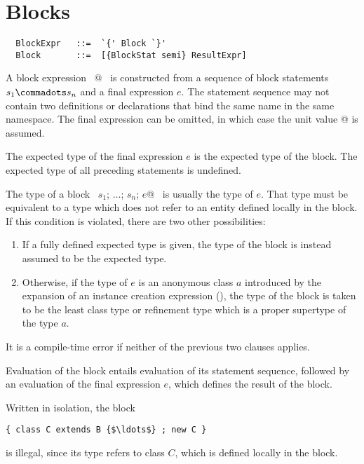 \section{Blocks}
\label{sec:blocks}

\syntax\begin{lstlisting}
  BlockExpr   ::=  `{' Block `}'
  Block       ::=  [{BlockStat semi} ResultExpr]
\end{lstlisting}

A block expression ~@~ is
constructed from a sequence of block statements $s_1 \commadots s_n$
and a final expression $e$.  The statement sequence may not contain
two definitions or declarations that bind the same name in the same
namespace.  The final expression can be omitted, in which
case the unit value \lstinline@{}@ is assumed.


The expected type of the final expression $e$ is the expected
type of the block. The expected type of all preceding statements is
undefined.

The type of a block ~\lstinline@$s_1$; $\ldots$; $s_n$; $e$@~ is
usually the type of $e$.  That type must be equivalent to a type which
does not refer to an entity defined locally in the block. If this
condition is violated, there are two other possibilities:
\begin{enumerate}
\item
If a fully defined expected type is given, the
type of the block is instead assumed to be the expected type.
\item 
Otherwise, if the type of $e$ is an anonymous class $a$ introduced by the
expansion of an instance creation expression
(), the type of the block is taken to be the 
least class type or refinement type which is a proper supertype of the type $a$.
\end{enumerate}
It is a compile-time error if neither of the previous two clauses applies.

Evaluation of the block entails evaluation of its
statement sequence, followed by an evaluation of the final expression
$e$, which defines the result of the block.

\example
Written in isolation, 
the block 
\begin{lstlisting}
{ class C extends B {$\ldots$} ; new C }
\end{lstlisting}
is illegal, since its type
refers to class $C$, which is defined locally in the block.


